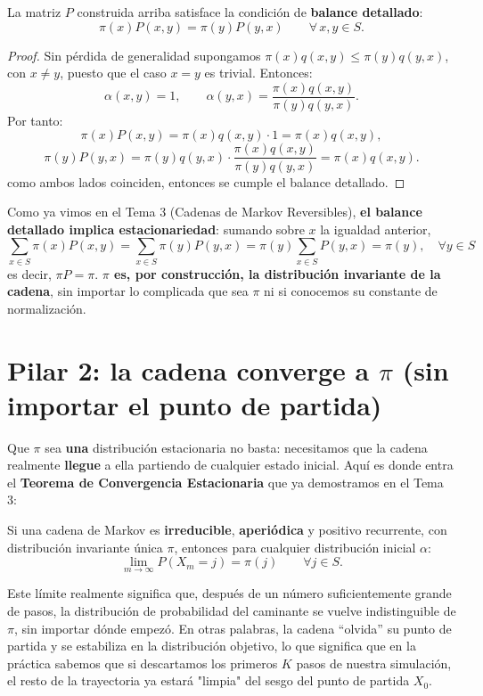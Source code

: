 \begin{prop}
    La matriz $P$ construida arriba satisface la condición de \textbf{balance detallado}:
    \[
    \pi(x)P(x,y) = \pi(y)P(y,x) \qquad \forall\, x,y\in S.
    \]
\begin{proof}
    Sin pérdida de generalidad supongamos $\pi(x)q(x,y) \le \pi(y)q(y,x)$, con $x\neq y$, puesto que el caso $x=y$ es trivial. Entonces:
    \[
    \alpha(x,y) = 1, \qquad \alpha(y,x) = \frac{\pi(x)q(x,y)}{\pi(y)q(y,x)}.
    \]
    Por tanto:
    \[
    \pi(x)P(x,y) = \pi(x)q(x,y)\cdot 1 = \pi(x)q(x,y),
    \]
    \[
    \pi(y)P(y,x) = \pi(y)q(y,x)\cdot \frac{\pi(x)q(x,y)}{\pi(y)q(y,x)} = \pi(x)q(x,y).
    \]
    como ambos lados coinciden, entonces se cumple el balance detallado. 
\end{proof}
\end{prop}

\begin{coro}
Como ya vimos en el Tema 3 (Cadenas de Markov Reversibles), \textbf{el balance detallado implica estacionariedad}: sumando sobre $x$ la igualdad anterior,
\[
\sum_{x\in S} \pi(x)P(x,y) = \sum_{x\in S}\pi(y)P(y,x) = \pi(y)\sum_{x\in S}P(y,x) = \pi(y), \quad \forall y\in S
\]
es decir, $\pi P = \pi$. \textbf{$\pi$ es, por construcción, la distribución invariante de la cadena}, sin importar lo complicada que sea $\pi$ ni si conocemos su constante de normalización.
\end{coro}

\section{Pilar 2: la cadena converge a $\pi$ (sin importar el punto de partida)}

\noindent
Que $\pi$ sea \textbf{una} distribución estacionaria no basta: necesitamos que la cadena realmente \textbf{llegue} a ella partiendo de cualquier estado inicial. Aquí es donde entra el \textbf{Teorema de Convergencia Estacionaria} que ya demostramos en el Tema 3:

\begin{teo}
Si una cadena de Markov es \textbf{irreducible}, \textbf{aperiódica} y positivo recurrente, con distribución invariante única $\pi$, entonces para cualquier distribución inicial $\alpha$:
\[
\lim_{m\to\infty} P(X_m = j) = \pi(j) \qquad \forall j\in S.
\]
\end{teo}
\noindent
Este límite realmente significa que, después de un número suficientemente grande de pasos, la distribución de probabilidad del caminante se vuelve indistinguible de $\pi$, sin importar dónde empezó. En otras palabras, la cadena ``olvida'' su punto de partida y se estabiliza en la distribución objetivo, lo que significa que en la práctica sabemos que si descartamos los primeros $K$ pasos de nuestra simulación, el resto de la trayectoria ya estará "limpia" del sesgo del punto de partida $X_0$.\\

